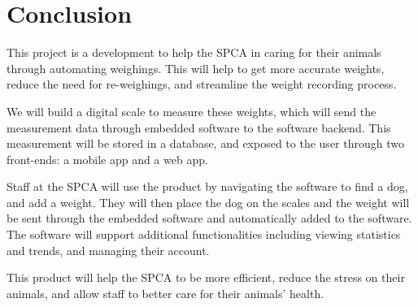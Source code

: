 
\chapter{Conclusion}

This project is a development to help the SPCA in caring for their animals through automating weighings. This will help to get more accurate weights, reduce the need for re-weighings, and streamline the weight recording process. 

We will build a digital scale to measure these weights, which will send the measurement data through embedded software to the software backend. This measurement will be stored in a database, and exposed to the user through two front-ends: a mobile app and a web app. 

Staff at the SPCA will use the product by navigating the software to find a dog, and add a weight. They will then place the dog on the scales and the weight will be sent through the embedded software and automatically added to the software. The software will support additional functionalities including viewing statistics and trends, and managing their account. 

This product will help the SPCA to be more efficient, reduce the stress on their animals, and allow staff to better care for their animals’ health. 
